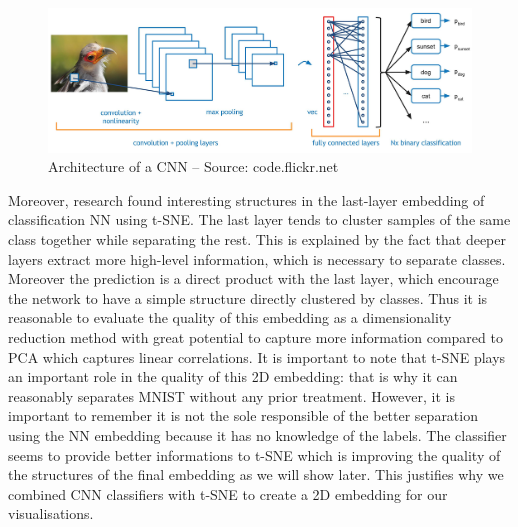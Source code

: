 \documentclass[a4paper,12pt]{report}
\begin{document}
\begin{figure}[h]
    \begin{center}
        \includegraphics[width=\textwidth]{thesis_figures/conv-net2.jpg}
    \end{center}
    \caption{Architecture of a CNN -- Source: code.flickr.net}
    \label{fig:convnet}
\end{figure}

Moreover, research found interesting structures in the last-layer embedding of classification NN using t-SNE.
The last layer tends to cluster samples of the same class together while separating the rest\cite{donahue2013decaf}\cite{yu2014visualizing}.
This is explained by the fact that deeper layers extract more high-level information, which is necessary to separate classes. Moreover the prediction is a direct product with the last layer, which encourage the network to have a simple structure directly clustered by classes.
Thus it is reasonable to evaluate the quality of this embedding as a dimensionality reduction method with great potential to capture more information compared to PCA which captures linear correlations.
It is important to note that t-SNE plays an important role in the quality of this 2D embedding: that is why it can reasonably separates MNIST without any prior treatment.
However, it is important to remember it is not the sole responsible of the better separation using the NN embedding because it has no knowledge of the labels.
The classifier seems to provide better informations to t-SNE which is improving the quality of the structures of the final embedding as we will show later.
This justifies why we combined CNN classifiers with t-SNE to create a 2D embedding for our visualisations.


\end{document}
